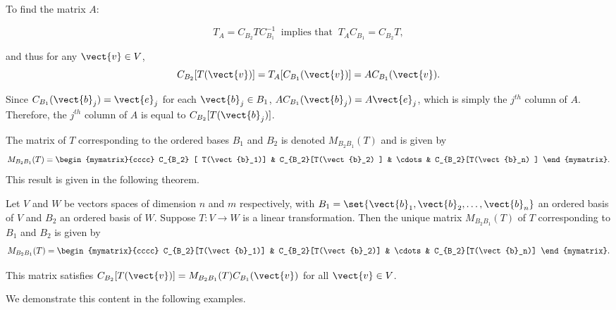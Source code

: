 To find the matrix $A$:

\[ T_A=C_{B_2}TC_{B_1}^{-1}~\mbox{ implies that }~
T_AC_{B_1}=C_{B_2}T,\]

and thus for any $\vect{v}\in V$, 
\[ C_{B_2}[T(\vect{v})] = T_A[C_{B_1}(\vect{v})] 
=AC_{B_1}(\vect{v}).\]

Since $C_{B_1}(\vect{b}_j)=\vect{e}_j$
for each $\vect{b}_j\in B_1$,
$AC_{B_1}(\vect{b}_j)=A\vect{e}_j$, which is simply the
$j^{th}$ column of $A$.
Therefore, the $j^{th}$ column of $A$ is equal to $C_{B_2}[T(\vect{b}_j)]$.

The matrix of $T$ corresponding to the ordered
bases $B_1$ and $B_2$ is denoted $ M_{B_2B_1}(T)$ and is given by 
\[ M_{B_2B_1}(T)=
\begin{mymatrix}{cccc}
C_{B_2} [ T(\vect{b}_1)] & C_{B_2}[T(\vect{b}_2) ] &
\cdots & C_{B_2}[T(\vect{b}_n) ] \end{mymatrix}.\] 
This result is given in the following theorem. 

\begin{theorem}{}{}
Let $V$ and $W$ be vectors spaces of dimension
$n$ and $m$ respectively, with $B_1=\set{\vect{b}_1, \vect{b}_2, \ldots, \vect{b}_n}$ an
ordered basis of $V$ and $B_2$ an ordered basis of $W$. Suppose $T:V\to W$ is a linear transformation. Then the unique matrix $M_{B_2B_1}(T)$ of $T$ corresponding to $B_1$ and $B_2$ is given by 
\[ M_{B_2B_1}(T)=
\begin{mymatrix}{cccc}
C_{B_2}[T(\vect{b}_1)] & C_{B_2}[T(\vect{b}_2)] &
\cdots & C_{B_2}[T(\vect{b}_n)] \end{mymatrix}.\]

This matrix satisfies  $C_{B_2}[T(\vect{v})]=M_{B_2B_1}(T)C_{B_1}(\vect{v})$ for all $\vect{v}\in V$.
\end{theorem}

We demonstrate this content in the following examples. 

